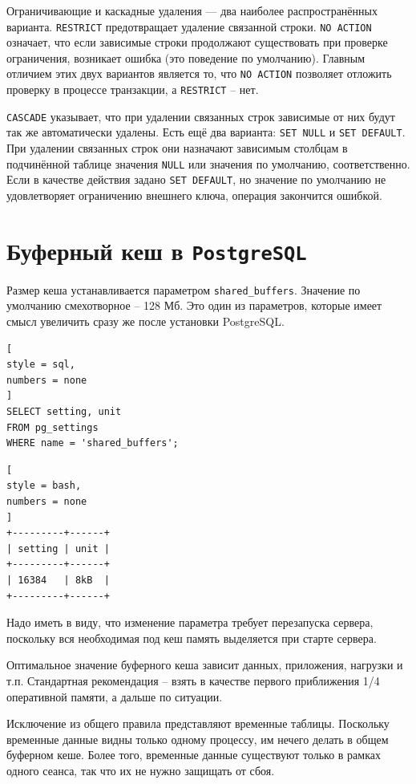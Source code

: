 \documentclass[%
	11pt,
	a4paper,
	utf8,
		]{article}
\begin{document}
Ограничивающие и каскадные удаления — два наиболее распространённых варианта. \texttt{RESTRICT} предотвращает удаление связанной строки. \texttt{NO ACTION} означает, что если зависимые строки продолжают существовать при проверке ограничения, возникает ошибка (это поведение по умолчанию). Главным отличием этих двух вариантов является то, что \texttt{NO ACTION} позволяет отложить проверку в процессе транзакции, а \texttt{RESTRICT} -- нет.

\texttt{CASCADE} указывает, что при удалении связанных строк зависимые от них будут так же автоматически удалены. Есть ещё два варианта: \texttt{SET NULL} и \texttt{SET DEFAULT}. При удалении связанных строк они назначают зависимым столбцам в подчинённой таблице значения \texttt{NULL} или значения по умолчанию, соответственно. Если в качестве действия задано \texttt{SET DEFAULT}, но значение по умолчанию не удовлетворяет ограничению внешнего ключа, операция закончится ошибкой.

\section{Буферный кеш в \texttt{PostgreSQL}}

Размер кеша устанавливается параметром \verb|shared_buffers|. Значение по умолчанию смехотворное -- 128 Мб. Это один из параметров, которые имеет смысл увеличить сразу же после установки PostgreSQL.

\begin{lstlisting}[
style = sql,
numbers = none
]
SELECT setting, unit
FROM pg_settings
WHERE name = 'shared_buffers';
\end{lstlisting}

\begin{lstlisting}[
style = bash,
numbers = none
]
+---------+------+
| setting | unit |
+---------+------+
| 16384   | 8kB  |
+---------+------+
\end{lstlisting}

Надо иметь в виду, что изменение параметра требует перезапуска сервера, поскольку вся необходимая под кеш память выделяется при старте сервера.

Оптимальное значение буферного кеша зависит данных, приложения, нагрузки и т.п. Стандартная рекомендация -- взять в качестве первого приближения 1/4 оперативной памяти, а дальше по ситуации.

Исключение из общего правила представляют временные таблицы. Поскольку временные данные видны только одному процессу, им нечего делать в общем буферном кеше. Более того, временные данные существуют только в рамках одного сеанса, так что их не нужно защищать от сбоя.
\end{document}
